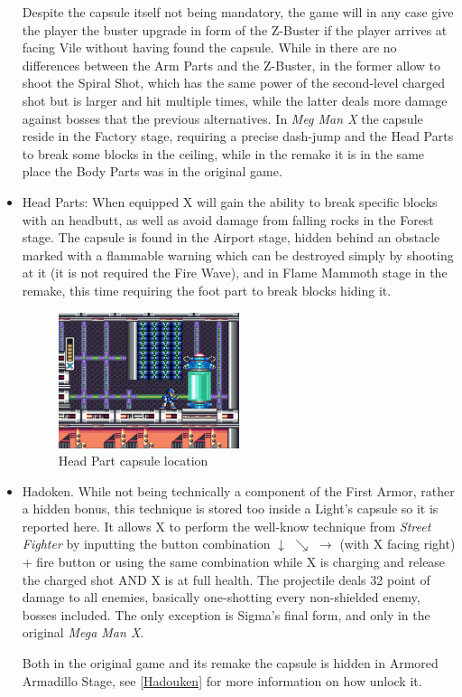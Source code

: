 \begin{itemize}
	Despite the capsule itself not being mandatory, the game will in any case give the player the buster upgrade in form of the Z-Buster if the player arrives at facing Vile without having found the capsule. While in \x there are no differences between the Arm Parts and the Z-Buster, in \mhx the former allow to shoot the Spiral Shot, which has the same power of the second-level charged shot but is larger and hit multiple times, while the latter deals more damage against bosses that the previous alternatives. In \textit{Meg Man X} the capsule reside in the Factory stage, requiring a precise dash-jump and the Head Parts to break some blocks in the ceiling, while in the remake it is in the same place the Body Parts was in the original game.
	
	\item Head Parts: When equipped X will gain the ability to break specific blocks with an headbutt, as well as avoid damage from falling rocks in the Forest stage. The capsule is found in the Airport stage, hidden behind an obstacle marked with a flammable warning which can be destroyed simply by shooting at it (it is not required the Fire Wave), and in Flame Mammoth stage in the remake, this time requiring the foot part to break blocks hiding it.
	\begin{figure}[h]
		\centering
		\includegraphics[width=0.5\textwidth]{figures/X1/Storm_armor_2.jpg}
		\caption{Head Part capsule location}
	\end{figure}
	
	\item Hadoken. While not being technically a component of the First Armor, rather a hidden bonus, this technique is stored too inside a Light's capsule so it is reported here. It allows X to perform the well-know technique from \textit{Street Fighter} by inputting the button combination $\downarrow$ $\searrow$ $\rightarrow$ (with X facing right) + fire button or using the same combination while X is charging and release the charged shot\cite{RTA_wiki:X1}  AND X is at full health. The projectile deals 32 point of damage\cite{wiki:Hadoken} to all enemies, basically one-shotting every non-shielded enemy, bosses included. The only exception is Sigma's final form, and only in the original \textit{Mega Man X}. 
	
	Both in the original game and its remake the capsule is hidden in Armored Armadillo Stage, see \ref{Hadouken} for more information on how unlock it.
\end{itemize}

